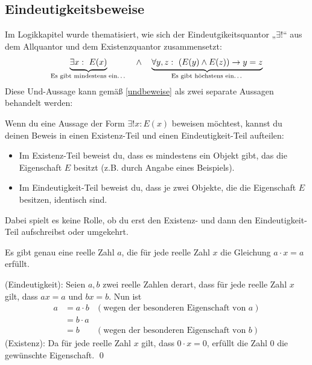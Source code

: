 \subsection*{Eindeutigkeitsbeweise}


Im Logikkapitel wurde thematisiert, wie sich der Eindeutgikeitsquantor „$\exists !$“ aus dem Allquantor und dem Existenzquantor zusammensetzt:
    \[ \underbrace{\exists x:\ E(x)}_{\text{Es gibt mindestens ein\dots}}\quad \land\quad \underbrace{\forall y,z:\ (E(y)\land E(z)) \to y=z}_{\text{Es gibt höchstens ein\dots}}\]
Diese Und-Aussage kann gemäß \cref{undbeweise} als zwei separate Aussagen behandelt werden:


\begin{satz} \label{eindbeweis} 
    Wenn du eine Aussage der Form $\exists ! x: E(x)$ beweisen möchtest, kannst du deinen Beweis in einen Existenz-Teil und einen Eindeutigkeit-Teil aufteilen:
    \begin{itemize}
        \item Im Existenz-Teil beweist du, dass es mindestens ein Objekt gibt, das die Eigenschaft $E$ besitzt (z.B. durch Angabe eines Beispiels).
        \item Im Eindeutigkeit-Teil beweist du, dass je zwei Objekte, die die Eigenschaft $E$ besitzen, identisch sind.
    \end{itemize}
    Dabei spielt es keine Rolle, ob du erst den Existenz- und dann den Eindeutigkeit-Teil aufschreibst oder umgekehrt.
\end{satz}


\begin{bsp} \label{bsp:eindbeweis}
    Es gibt genau eine reelle Zahl $a$, die für jede reelle Zahl $x$ die Gleichung $a\cdot x=a$ erfüllt.
\end{bsp}


\begin{bew}
    (Eindeutigkeit): Seien $a,b$ zwei reelle Zahlen derart, dass für jede reelle Zahl $x$ gilt, dass $ax=a$ und $bx=b$. Nun ist
    \begin{align*}
        a & = a\cdot b & (\text{wegen der besonderen Eigenschaft von $a$}) \\
        & = b \cdot a  \\
        & = b & (\text{wegen der besonderen Eigenschaft von $b$})
    \end{align*}
    (Existenz): Da für jede reelle Zahl $x$ gilt, dass $0\cdot x=0$, erfüllt die Zahl $0$ die gewünschte Eigenschaft. \qed
\end{bew}


